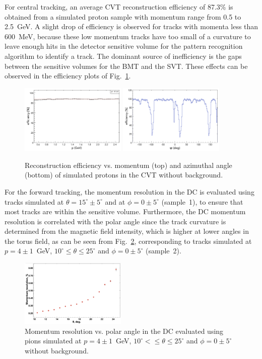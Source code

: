For central tracking, an average CVT reconstruction efficiency of 87.3\% is obtained from a simulated proton sample with
momentum range from 0.5 to 2.5~GeV. A slight drop of efficiency is observed for tracks with momenta less than 600~MeV, because
 these low momentum tracks have too small of a curvature to leave enough hits in the detector sensitive volume for the pattern recognition algorithm to
identify a track.   The dominant source of inefficiency is the gaps between the sensitive volumes for the BMT and the SVT.  These effects can be observed in the efficiency plots of Fig.~\ref{fig:cvtpeff}.

\begin{figure}[h]
\includegraphics[width=0.45\textwidth]{pics/CVTPEff.png}
\includegraphics[width=0.45\textwidth]{pics/CVTPhiEff.png}
\caption{Reconstruction efficiency vs. momentum (top) and azimuthal angle (bottom) of simulated protons in the CVT without background.}
\label{fig:cvtpeff}
\end{figure}

For the forward tracking, the momentum resolution in the DC is evaluated using tracks simulated at
$\theta =15^\circ \pm 5^\circ$ and at $\phi = 0 \pm 5^\circ$ (sample~1), to ensure that most tracks are within the
sensitive volume. Furthermore, the DC momentum resolution is correlated with the polar angle since the track
curvature is determined from the magnetic field intensity, which is higher at lower angles in the torus field, as can
be seen from Fig.~\ref{fig:restheta}, corresponding to tracks simulated at $p=4\pm 1$~GeV,
$10^\circ \leq \theta \leq 25^\circ$ and $\phi = 0 \pm 5^\circ$ (sample~2).

\begin{figure}
\includegraphics[width=0.45\textwidth]{pics/DCRes2.png}
\caption{Momentum resolution vs. polar angle in the DC evaluated using pions simulated at $p=4\pm 1$~GeV,
  $10^\circ <\leq \theta \leq 25^\circ$ and $\phi = 0 \pm 5^\circ$ without background.}
\label{fig:restheta}
\end{figure}

